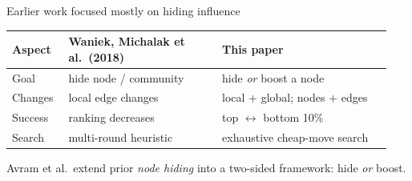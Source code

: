 \begin{frame}{Earlier work focused mostly on hiding influence}
  \vspace{0.4em}
  \centering
  \small
  \begin{tabular}{@{}p{0.14\linewidth}p{0.38\linewidth}p{0.42\linewidth}@{}}
    \toprule
    \textbf{Aspect} & \textbf{Waniek, Michalak et al.\ (2018)} & \textbf{This paper} \\
    \midrule
    Goal     & hide node / community              & hide \emph{or} boost a node \\
    \addlinespace[4pt]
    Changes  & local edge changes                 & local + global; nodes + edges \\
    \addlinespace[4pt]
    Success  & ranking decreases                  & top $\leftrightarrow$ bottom 10\% \\
    \addlinespace[4pt]
    Search   & multi-round heuristic              & exhaustive cheap-move search \\
    \bottomrule
  \end{tabular}
  \vspace{0.8em}

  \begin{flushleft}
  {\small\color{PresFourMuted}Avram et al.\ extend prior \emph{node hiding} into a two-sided framework: hide \emph{or} boost.}
  \end{flushleft}
\end{frame}

